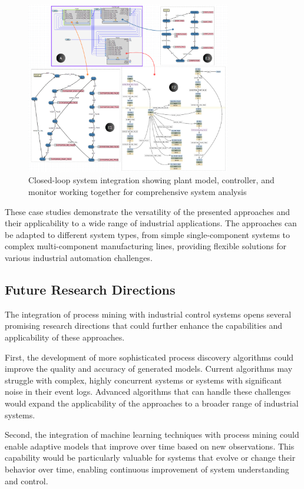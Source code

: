 \begin{figure}[h]
    \centering
    \includegraphics[width=0.8\textwidth]{MX_Papers/Paper7/images/CLMC.PNG}
    \caption{Closed-loop system integration showing plant model, controller, and monitor working together for comprehensive system analysis}
    \label{fig:closed_loop_integration}
\end{figure}

These case studies demonstrate the versatility of the presented approaches and their applicability to a wide range of industrial applications. The approaches can be adapted to different system types, from simple single-component systems to complex multi-component manufacturing lines, providing flexible solutions for various industrial automation challenges.

\subsection{Future Research Directions}

The integration of process mining with industrial control systems opens several promising research directions that could further enhance the capabilities and applicability of these approaches.

First, the development of more sophisticated process discovery algorithms could improve the quality and accuracy of generated models. Current algorithms may struggle with complex, highly concurrent systems or systems with significant noise in their event logs. Advanced algorithms that can handle these challenges would expand the applicability of the approaches to a broader range of industrial systems.

Second, the integration of machine learning techniques with process mining could enable adaptive models that improve over time based on new observations. This capability would be particularly valuable for systems that evolve or change their behavior over time, enabling continuous improvement of system understanding and control.


